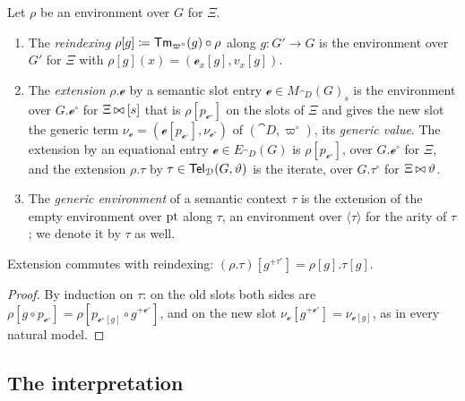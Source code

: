 \begin{definition}\label{def:environment-operations}
    Let $\rho$ be an environment over $G$ for $\Xi$.
    \begin{enumerate}
        \item The \emph{reindexing} $\rho[g] \coloneqq \mathsf{Tm}_{\varpi^{\circ}}(g) \circ \rho$ along $g : G' \to G$ is the environment over $G'$ for $\Xi$ with $\rho[g](x) = (\mathscr{e}_x[g], v_x[g])$.
        \item The \emph{extension} $\rho.\mathscr{e}$ by a semantic slot entry $\mathscr{e} \in M_{\cat{D}}(G)_s$ is the environment over $G.\mathscr{e}^{\circ}$ for $\Xi \mathbin{\bowtie} [s]$ that is $\rho[p_{\mathscr{e}^{\circ}}]$ on the slots of $\Xi$ and gives the new slot the generic term $\nu_\mathscr{e} = (\mathscr{e}[p_{\mathscr{e}^{\circ}}], \nu_{\mathscr{e}^{\circ}})$ of $(\cat{D}, \varpi^{\circ})$, its \emph{generic value}. The extension by an equational entry $\mathscr{e} \in E_{\cat{D}}(G)$ is $\rho[p_{\mathscr{e}^{\circ}}]$, over $G.\mathscr{e}^{\circ}$ for $\Xi$, and the extension $\rho.\tau$ by $\tau \in \mathsf{Tel}_{\mathcal{D}}(G, \vartheta)$ is the iterate, over $G.\tau^{\circ}$ for $\Xi \mathbin{\bowtie} \vartheta$.
        \item The \emph{generic environment} of a semantic context $\tau$ is the extension of the empty environment over $\mathrm{pt}$ along $\tau$, an environment over $\langle \tau \rangle$ for the arity of $\tau$; we denote it by $\tau$ as well.
    \end{enumerate}
\end{definition}

\begin{lemma}\label{lem:environment-operations}
    Extension commutes with reindexing: $(\rho.\tau)[g^{+\tau^{\circ}}] = \rho[g].\tau[g]$.
\end{lemma}

\begin{proof}
    By induction on $\tau$: on the old slots both sides are $\rho[g \circ p_{\mathscr{e}^{\circ}}] = \rho[p_{\mathscr{e}^{\circ}[g]} \circ g^{+\mathscr{e}^{\circ}}]$, and on the new slot $\nu_\mathscr{e}[g^{+\mathscr{e}^{\circ}}] = \nu_{\mathscr{e}[g]}$, as in every natural model.
\end{proof}

\subsection{The interpretation}
\label{sec:interpretation-definition}

